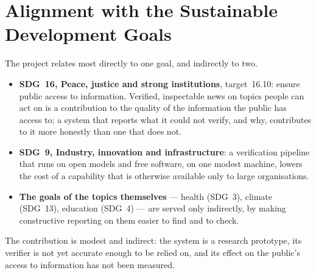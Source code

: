 
\section{Alignment with the Sustainable Development Goals}
\label{sec:sdg}

The project relates most directly to one goal, and indirectly to two.

\begin{itemize}
    \item \textbf{SDG~16, Peace, justice and strong institutions},
    target~16.10: ensure public access to information. Verified,
    inspectable news on topics people can act on is a contribution to
    the quality of the information the public has access to; a system
    that reports what it could not verify, and why, contributes to it
    more honestly than one that does not.
    \item \textbf{SDG~9, Industry, innovation and infrastructure}: a
    verification pipeline that runs on open models and free software, on
    one modest machine, lowers the cost of a capability that is otherwise
    available only to large organisations.
    \item \textbf{The goals of the topics themselves} --- health (SDG~3),
    climate (SDG~13), education (SDG~4) --- are served only indirectly,
    by making constructive reporting on them easier to find and to check.
\end{itemize}

The contribution is modest and indirect: the system is a research
prototype, its verifier is not yet accurate enough to be relied on, and
its effect on the public's access to information has not been measured.
